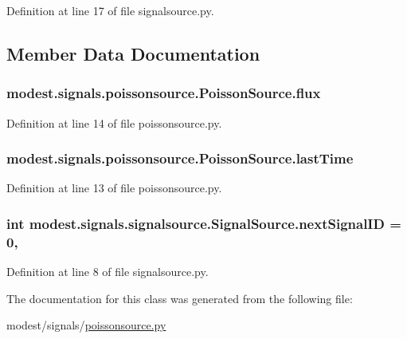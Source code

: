 Definition at line 17 of file signalsource.\+py.



\subsection{Member Data Documentation}
\subsubsection[{\texorpdfstring{flux}{flux}}]{\setlength{\rightskip}{0pt plus 5cm}modest.\+signals.\+poissonsource.\+Poisson\+Source.\+flux}\hypertarget{classmodest_1_1signals_1_1poissonsource_1_1PoissonSource_a6f2c657ad936b921715d826ac74f7fe5}{}\label{classmodest_1_1signals_1_1poissonsource_1_1PoissonSource_a6f2c657ad936b921715d826ac74f7fe5}


Definition at line 14 of file poissonsource.\+py.

\subsubsection[{\texorpdfstring{last\+Time}{lastTime}}]{\setlength{\rightskip}{0pt plus 5cm}modest.\+signals.\+poissonsource.\+Poisson\+Source.\+last\+Time}\hypertarget{classmodest_1_1signals_1_1poissonsource_1_1PoissonSource_a34395fc83bd8743a0a5ee69f9392a606}{}\label{classmodest_1_1signals_1_1poissonsource_1_1PoissonSource_a34395fc83bd8743a0a5ee69f9392a606}


Definition at line 13 of file poissonsource.\+py.

\subsubsection[{\texorpdfstring{next\+Signal\+ID}{nextSignalID}}]{\setlength{\rightskip}{0pt plus 5cm}int modest.\+signals.\+signalsource.\+Signal\+Source.\+next\+Signal\+ID = 0\hspace{0.3cm}{\ttfamily [static]}, {\ttfamily [inherited]}}\hypertarget{classmodest_1_1signals_1_1signalsource_1_1SignalSource_a453eafb550b551adbec0903deb63dfce}{}\label{classmodest_1_1signals_1_1signalsource_1_1SignalSource_a453eafb550b551adbec0903deb63dfce}


Definition at line 8 of file signalsource.\+py.



The documentation for this class was generated from the following file\+:\begin{DoxyCompactItemize}
\item 
modest/signals/\hyperlink{poissonsource_8py}{poissonsource.\+py}\end{DoxyCompactItemize}
